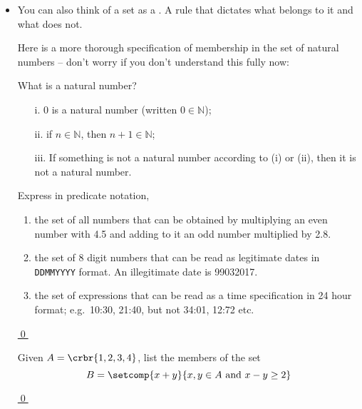 \documentclass[11pt]{article}
\begin{document}
\begin{itemize}

\item You can also think of a set as a . A rule that dictates what
belongs to it and what does not.

\item[] Here is a more thorough specification of membership in the set of natural
numbers -- don't worry if you don't
understand this fully now:


\hrulefill
\begin{udefinition}{What is a natural number?}
\begin{itemize}
\item[i.] 0 is a natural number (written $0\in\mathbb{N}$);
\item[ii.] if $n\in\mathbb{N}$, then  $n+1\in\mathbb{N}$; 
\item[iii.] If something is not a natural number according to (i) or (ii), then
it is not a natural number.
\end{itemize}
\end{udefinition}
\hrulefill


\hrulefill
\begin{uexercise} \label{ex-pred}
Express in predicate notation,
\begin{enumerate}
\item the set of all numbers that can be obtained by multiplying an even
number with 4.5 and adding to it an odd number multiplied by 2.8. 
\item the set of 8 digit numbers that can be read as legitimate dates in
\mbox{\texttt{DDMMYYYY}} format. An illegitimate date is 99032017.
\item the set of expressions that can be read as a time specification in 24
hour format; e.g.\ 10:30, 21:40, but not 34:01, 12:72 etc.
\end{enumerate}

\hyperref[ex-pred-sol]{\qed}
\end{uexercise}

\begin{uexercise} \label{ex-pred2}
Given $A = \crbr{1,2,3,4}$, list the members of the set
\[
B=\setcomp{x+y}{x,y\in A \text{ and } x-y \geq 2}
\]

\hyperlink{ex-pred2-sol}{\qed}
\end{uexercise}
\hrulefill
\end{itemize}
\end{document}
